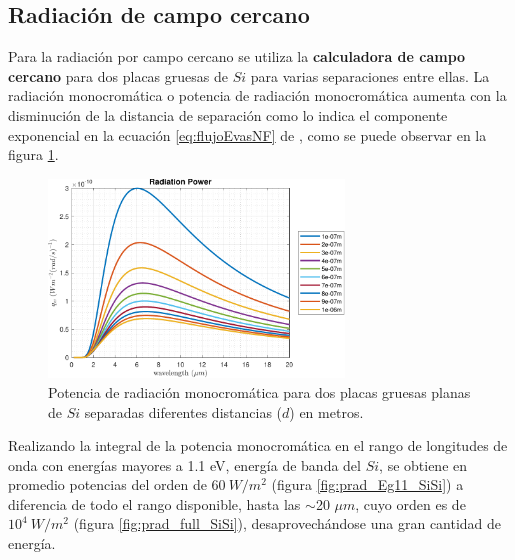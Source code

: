 \subsection{Radiación de campo cercano}
Para la radiación por campo cercano se utiliza la \textbf{calculadora de campo cercano} para dos placas gruesas de $Si$ para varias separaciones entre ellas. La radiación monocromática o potencia de radiación monocromática aumenta con la disminución de la distancia de separación como lo indica el componente exponencial en la ecuación \eqref{eq:flujoEvasNF} de \cite{nfTPV_equations}, como se puede observar en la figura \ref{fig:rad_SiSi_ds}.
\begin{figure}[H]
	\centering
		\includegraphics[width=0.7\textwidth]{figuras/Resultados/radiacion/SiSi_ds.pdf}
	\caption{Potencia de radiación monocromática para dos placas gruesas planas de $Si$ separadas diferentes distancias ($d$) en metros.}
	\label{fig:rad_SiSi_ds}
\end{figure}
Realizando la integral de la potencia monocromática en el rango de longitudes de onda con energías mayores a 1.1 eV, energía de banda del $Si$, se obtiene en promedio potencias del orden de $60 \ W/m^2$ (figura \ref{fig:prad_Eg11_SiSi}) a diferencia de todo el rango disponible, hasta las $\sim$20 $\mu m$, cuyo orden es de $10^4 \ W/m^2$ (figura \ref{fig:prad_full_SiSi}), desaprovechándose una gran cantidad de energía.
